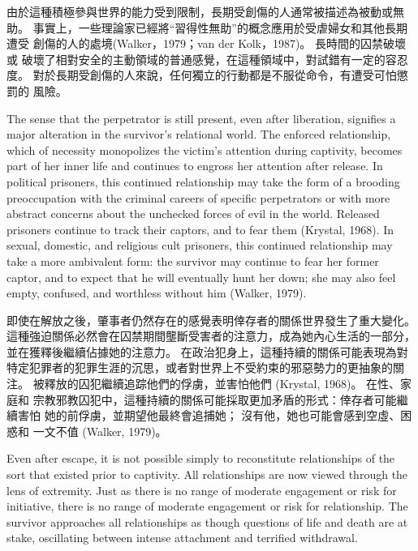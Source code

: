 \documentclass[12pt]{article}
\begin{document}
    由於這種積極參與世界的能力受到限制，長期受創傷的人通常被描述為被動或無助。
    事實上，一些理論家已經將“習得性無助”的概念應用於受虐婦女和其他長期遭受
    創傷的人的處境(Walker，1979；van der Kolk，1987)。 長時間的囚禁破壞或
    破壞了相對安全的主動領域的普通感覺，在這種領域中，對試錯有一定的容忍度。
    對於長期受創傷的人來說，任何獨立的行動都是不服從命令，有遭受可怕懲罰的
    風險。

    The sense that the perpetrator is still present, even after liberation,
    signifies a major alteration in the survivor's relational world. The
    enforced relationship, which of necessity monopolizes the victim's
    attention during captivity, becomes part of her inner life and continues to
    engross her attention after release. In political prisoners, this continued
    relationship may take the form of a brooding preoccupation with the
    criminal careers of specific perpetrators or with more abstract concerns
    about the unchecked forces of evil in the world. Released prisoners
    continue to track their captors, and to fear them (Krystal, 1968). In
    sexual, domestic, and religious cult prisoners, this continued relationship
    may take a more ambivalent form: the survivor may continue to fear her
    former captor, and to expect that he will eventually hunt her down; she may
    also feel empty, confused, and worthless without him (Walker, 1979).

    即使在解放之後，肇事者仍然存在的感覺表明倖存者的關係世界發生了重大變化。
    這種強迫關係必然會在囚禁期間壟斷受害者的注意力，成為她內心生活的一部分，
    並在獲釋後繼續佔據她的注意力。 在政治犯身上，這種持續的關係可能表現為對
    特定犯罪者的犯罪生涯的沉思，或者對世界上不受約束的邪惡勢力的更抽象的關注。
    被釋放的囚犯繼續追踪他們的俘虜，並害怕他們 (Krystal, 1968)。 在性、家庭和
    宗教邪教囚犯中，這種持續的關係可能採取更加矛盾的形式：倖存者可能繼續害怕
    她的前俘虜，並期望他最終會追捕她； 沒有他，她也可能會感到空虛、困惑和
    一文不值 (Walker, 1979)。

    Even after escape, it is not possible simply to reconstitute relationships
    of the sort that existed prior to captivity. All relationships are now
    viewed through the lens of extremity. Just as there is no range of moderate
    engagement or risk for initiative, there is no range of moderate engagement
    or risk for relationship. The survivor approaches all relationships as
    though questions of life and death are at stake, oscillating between
    intense attachment and terrified withdrawal.
\end{document}
